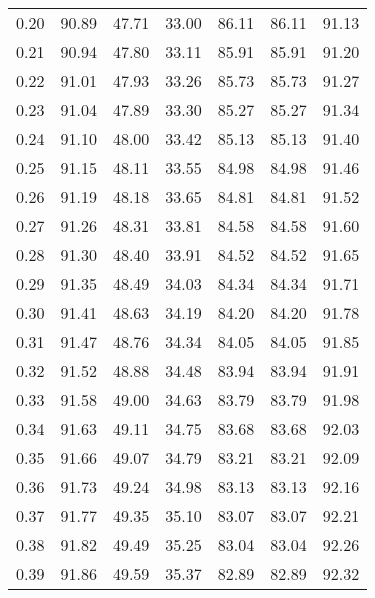 \begin{tabular}{|c|c|c|c|c|c|c|}
      0.20 &     90.89 &     47.71 &      33.00 &   86.11 &      86.11 &         91.13 \\
      0.21 &     90.94 &     47.80 &      33.11 &   85.91 &      85.91 &         91.20 \\
      0.22 &     91.01 &     47.93 &      33.26 &   85.73 &      85.73 &         91.27 \\
      0.23 &     91.04 &     47.89 &      33.30 &   85.27 &      85.27 &         91.34 \\
      0.24 &     91.10 &     48.00 &      33.42 &   85.13 &      85.13 &         91.40 \\
      0.25 &     91.15 &     48.11 &      33.55 &   84.98 &      84.98 &         91.46 \\
      0.26 &     91.19 &     48.18 &      33.65 &   84.81 &      84.81 &         91.52 \\
      0.27 &     91.26 &     48.31 &      33.81 &   84.58 &      84.58 &         91.60 \\
      0.28 &     91.30 &     48.40 &      33.91 &   84.52 &      84.52 &         91.65 \\
      0.29 &     91.35 &     48.49 &      34.03 &   84.34 &      84.34 &         91.71 \\
      0.30 &     91.41 &     48.63 &      34.19 &   84.20 &      84.20 &         91.78 \\
      0.31 &     91.47 &     48.76 &      34.34 &   84.05 &      84.05 &         91.85 \\
      0.32 &     91.52 &     48.88 &      34.48 &   83.94 &      83.94 &         91.91 \\
      0.33 &     91.58 &     49.00 &      34.63 &   83.79 &      83.79 &         91.98 \\
      0.34 &     91.63 &     49.11 &      34.75 &   83.68 &      83.68 &         92.03 \\
      0.35 &     91.66 &     49.07 &      34.79 &   83.21 &      83.21 &         92.09 \\
      0.36 &     91.73 &     49.24 &      34.98 &   83.13 &      83.13 &         92.16 \\
      0.37 &     91.77 &     49.35 &      35.10 &   83.07 &      83.07 &         92.21 \\
      0.38 &     91.82 &     49.49 &      35.25 &   83.04 &      83.04 &         92.26 \\
      0.39 &     91.86 &     49.59 &      35.37 &   82.89 &      82.89 &         92.32 \\

\end{tabular}
